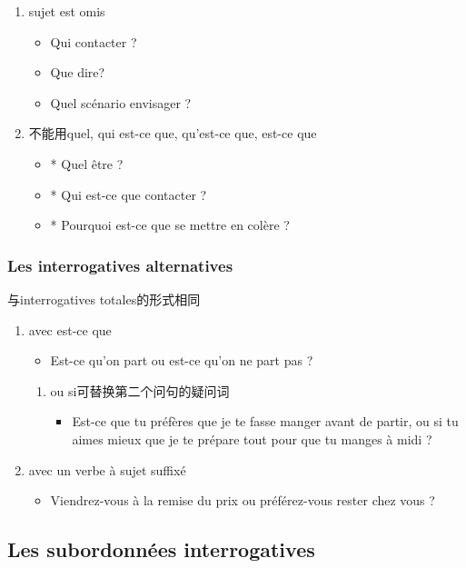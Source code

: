 \documentclass[UTF8]{report}
\begin{document}
\begin{enumerate}
    \item sujet est omis
    \begin{itemize}
        \item Qui contacter ?
        \item Que dire?
        \item Quel scénario envisager ?
    \end{itemize}
    \item 不能用quel, qui est-ce que, qu’est-ce que, est-ce que
    \begin{itemize}
        \item * Quel être ?
        \item * Qui est-ce que contacter ?
        \item * Pourquoi est-ce que se mettre en colère ?
    \end{itemize}
\end{enumerate}


\subsubsection{Les interrogatives alternatives}
与interrogatives totales的形式相同
\begin{enumerate}
    \item avec est-ce que 
    \begin{itemize}
        \item Est-ce qu’on part ou est-ce qu’on ne part pas ?
    \end{itemize}
    \begin{enumerate}
        \item ou si可替换第二个问句的疑问词
        \begin{itemize}
            \item Est-ce que tu préfères que je te fasse manger avant de partir, ou si tu aimes mieux que je te prépare tout pour que tu manges à midi ?
        \end{itemize}
    \end{enumerate}
    \item avec un verbe à sujet suffixé
    \begin{itemize}
        \item Viendrez-vous à la remise du prix ou préférez-vous rester chez vous ?
    \end{itemize}
\end{enumerate}

\subsection{Les subordonnées interrogatives}
\end{document}
